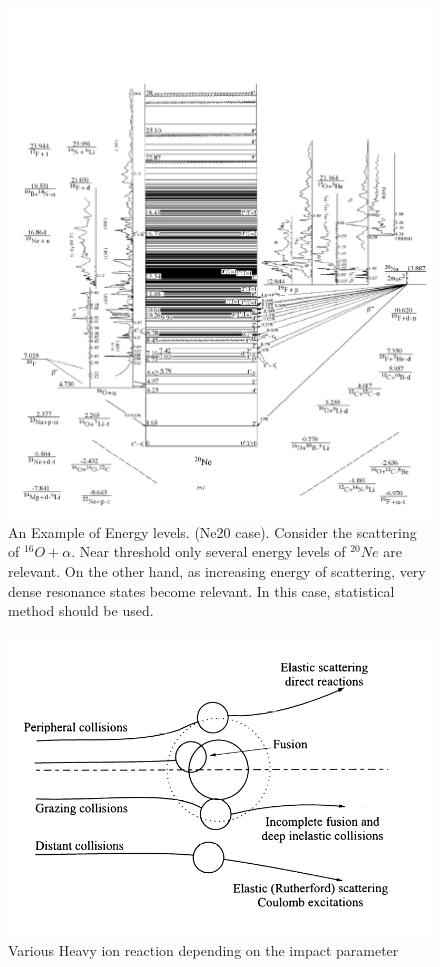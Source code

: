 \documentclass[11pt]{book}
\begin{document}
\begin{figure}
	\centering
	\includegraphics[width=0.8\linewidth]{Ne20}
	\caption{An Example of Energy levels. (Ne20 case).
	      Consider the scattering of $^{16}O+\alpha$.
          Near threshold only several energy levels of $^{20}Ne$ are relevant.
          On the other hand, as increasing energy of scattering,
          very dense resonance states become relevant. In this case, 
          statistical method should be used.  
           }
	\label{fig:ne20}
\end{figure}

\begin{figure}
	\centering
	\includegraphics[width=0.7\linewidth]{HI_reaction_impact_para}
	\caption{Various Heavy ion reaction depending on the impact parameter}
	\label{fig:hireactionimpactpara}
\end{figure}
\end{document}
